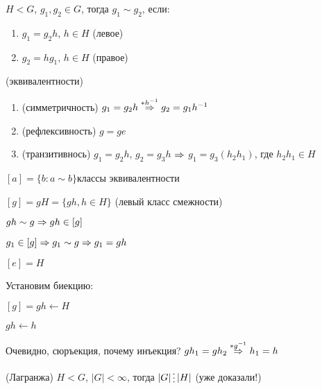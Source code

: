 \documentclass[11pt]{article}
\begin{document}
\begin{definition}
    $H<G$, $g_1,g_2 \in G$, тогда $g_1 \sim g_2$, если:
    \begin{enumerate}                               
    	\item $g_1=g_2 h$, $h \in H$ (левое)
    	\item $g_2=h g_1$, $h \in H$ (правое)
	\end{enumerate} 
\end{definition}

\begin{proofs2}{(эквивалентности)}
    \begin{enumerate}                               
    	\item (симметричность) $g_1=g_2 h \overset{*h^{-1}}{\Rightarrow} g_2 = g_1 h^{-1}$
    	\item (рефлексивность) $g=ge$
    	\item (транзитивнось) $g_1=g_2 h$, $g_2 = g_3 h$ $\Rightarrow$ $g_1=g_3(h_2 h_1)$, где $h_2 h_1 \in H$
	\end{enumerate} 
\end{proofs2}

\begin{definition}
    $[a] = \{b:a∼b\}$классы эквивалентности
\end{definition}

\begin{definition}
    $[g] = g H = \{g h, h \in H \}$ (левый класс смежности) 
    
    $g h \sim g \Rightarrow g h \in [g]$
    
    $g_1 \in [g] \Rightarrow g_1 \sim g \Rightarrow g_1 = g h$
\end{definition}

\begin{statement}
    $[e]=H$
    
    Установим биекцию: 
    
    $[g]=gh \leftarrow H$
    
    $gh \leftarrow h$
    
    Очевидно, сюръекция, почему инъекция? $g h_1 = g h_2 \overset{*g^{-1}}{\Rightarrow} h_1 = h$
\end{statement}

\begin{theorem2}{(Лагранжа)}
$H < G$, $|G| < \infty$, тогда $|G| \devides |H|$ (уже доказали!)
\end{theorem2}
\end{document}

